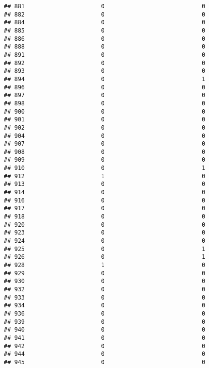 \documentclass[
]{article}
\begin{document}
\begin{verbatim}
## 881                      0                            0
## 882                      0                            0
## 884                      0                            0
## 885                      0                            0
## 886                      0                            0
## 888                      0                            0
## 891                      0                            0
## 892                      0                            0
## 893                      0                            0
## 894                      0                            1
## 896                      0                            0
## 897                      0                            0
## 898                      0                            0
## 900                      0                            0
## 901                      0                            0
## 902                      0                            0
## 904                      0                            0
## 907                      0                            0
## 908                      0                            0
## 909                      0                            0
## 910                      0                            1
## 912                      1                            0
## 913                      0                            0
## 914                      0                            0
## 916                      0                            0
## 917                      0                            0
## 918                      0                            0
## 920                      0                            0
## 923                      0                            0
## 924                      0                            0
## 925                      0                            1
## 926                      0                            1
## 928                      1                            0
## 929                      0                            0
## 930                      0                            0
## 932                      0                            0
## 933                      0                            0
## 934                      0                            0
## 936                      0                            0
## 939                      0                            0
## 940                      0                            0
## 941                      0                            0
## 942                      0                            0
## 944                      0                            0
## 945                      0                            0

\end{verbatim}
\end{document}
